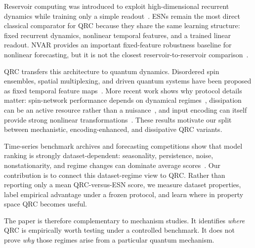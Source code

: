Reservoir computing was introduced to exploit high-dimensional recurrent dynamics while training only a simple readout~\cite{maass2002real,jaeger2004harnessing,lukosevicius2009reservoir}. ESNs remain the most direct classical comparator for QRC because they share the same learning structure: fixed recurrent dynamics, nonlinear temporal features, and a trained linear readout. NVAR provides an important fixed-feature robustness baseline for nonlinear forecasting, but it is not the closest reservoir-to-reservoir comparison~\cite{gauthier2021next}.

QRC transfers this architecture to quantum dynamics. Disordered spin ensembles, spatial multiplexing, and driven quantum systems have been proposed as fixed temporal feature maps~\cite{fujii2017harnessing,nakajima2019boosting,ghosh2019quantum}. More recent work shows why protocol details matter: spin-network performance depends on dynamical regimes~\cite{martinezpena2021dynamical}, dissipation can be an active resource rather than a nuisance~\cite{sannia2024dissipation}, and input encoding can itself provide strong nonlinear transformations~\cite{govia2022nonlinear}. These results motivate our split between mechanistic, encoding-enhanced, and dissipative QRC variants.

Time-series benchmark archives and forecasting competitions show that model ranking is strongly dataset-dependent: seasonality, persistence, noise, nonstationarity, and regime changes can dominate average scores~\cite{makridakis2018m4,godahewa2021monash}. Our contribution is to connect this dataset-regime view to QRC. Rather than reporting only a mean QRC-versus-ESN score, we measure dataset properties, label empirical advantage under a frozen protocol, and learn where in property space QRC becomes useful.

The paper is therefore complementary to mechanism studies. It identifies \emph{where} QRC is empirically worth testing under a controlled benchmark. It does not prove \emph{why} those regimes arise from a particular quantum mechanism.
